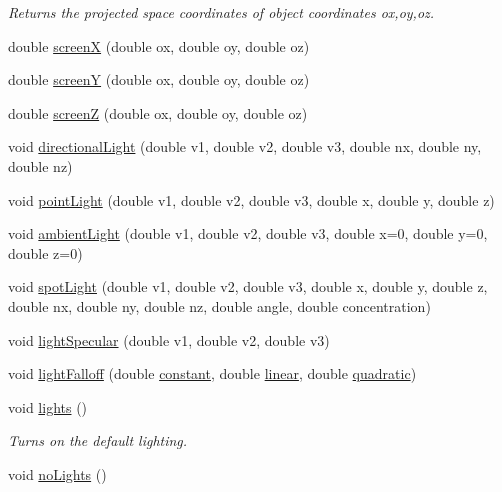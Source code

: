 \begin{DoxyCompactItemize}
\begin{DoxyCompactList}\small\item\em \-Returns the projected space coordinates of object coordinates ox,oy,oz. \end{DoxyCompactList}\item 
double \hyperlink{namespacecprocessing_a8ce792f437aceffc1eb7459593fd2cb0}{screen\-X} (double ox, double oy, double oz)
\item 
double \hyperlink{namespacecprocessing_a52d185d7ceeb94cffe6d9aed57a6aa4d}{screen\-Y} (double ox, double oy, double oz)
\item 
double \hyperlink{namespacecprocessing_a5dbe0a0bd7e63ae17bca9a0a82f1be88}{screen\-Z} (double ox, double oy, double oz)
\item 
void \hyperlink{namespacecprocessing_aa650015d05af290b6a9a84b91f469cfd}{directional\-Light} (double v1, double v2, double v3, double nx, double ny, double nz)
\item 
void \hyperlink{namespacecprocessing_ad96615723c2f0f36a6d2fbff1f136a23}{point\-Light} (double v1, double v2, double v3, double x, double y, double z)
\item 
void \hyperlink{namespacecprocessing_a424650181291261149d18e6422acbacc}{ambient\-Light} (double v1, double v2, double v3, double x=0, double y=0, double z=0)
\item 
void \hyperlink{namespacecprocessing_a73b8403f7fcd2ac084e22361404536ce}{spot\-Light} (double v1, double v2, double v3, double x, double y, double z, double nx, double ny, double nz, double angle, double concentration)
\item 
void \hyperlink{namespacecprocessing_a7c05adc9e787627af3f212ac9e70eed8}{light\-Specular} (double v1, double v2, double v3)
\item 
void \hyperlink{namespacecprocessing_a8d159e7189b41db79ab1b304a10fc8f4}{light\-Falloff} (double \hyperlink{lights_8cpp_a88de168fce6d89f37e5ceff0317b9f06}{constant}, double \hyperlink{lights_8cpp_aa7d568a84fe0f3179836f663743d6be2}{linear}, double \hyperlink{lights_8cpp_a5b54f49bd3fd03eee682575ba830cf99}{quadratic})
\item 
void \hyperlink{namespacecprocessing_ab1acc84389367328f202d254a91f757e}{lights} ()
\begin{DoxyCompactList}\small\item\em \-Turns on the default lighting. \end{DoxyCompactList}\item 
void \hyperlink{namespacecprocessing_a251e268f250938b938ceab16ff97b9a1}{no\-Lights} ()

\end{DoxyCompactItemize}

